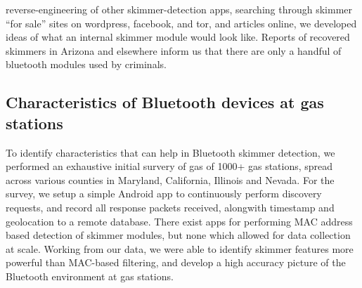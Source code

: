 
%

reverse-engineering of other skimmer-detection apps, searching through skimmer
``for sale'' sites on wordpress, facebook, and tor, and articles online, we
developed ideas of what an internal skimmer module would look like. Reports of
recovered skimmers in Arizona and elsewhere inform us that there are only a
handful of bluetooth modules used by criminals.

\subsection{Characteristics of Bluetooth devices at gas stations}

To identify characteristics that can help in Bluetooth skimmer detection, we
performed an exhaustive initial survery of gas of 1000+ gas stations, spread
across various counties in Maryland, California, Illinois and Nevada. For the
survey, we setup a simple Android app to continuously perform discovery
requests, and record all response packets received, alongwith timestamp and
geolocation to a remote database. There exist apps for performing MAC address
based detection of skimmer modules, but none which allowed for data collection
at scale. Working from our data, we were able to identify skimmer features more
powerful than MAC-based filtering, and develop a high accuracy picture of the
Bluetooth environment at gas stations.

